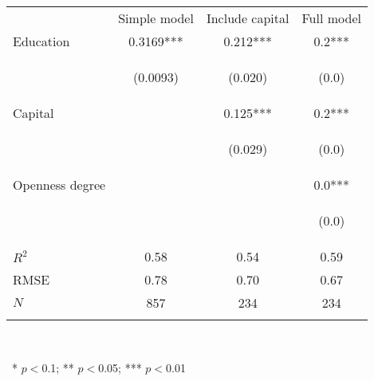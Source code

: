 \begin{center}
\begin{tabular}{lccc}
\hline \noalign{\smallskip} & Simple model & Include capital & Full model\\
\noalign{\smallskip}\hline \noalign{\smallskip}Education & 0.3169*** & 0.212*** & 0.2***\\
 & \begin{footnotesize}(0.0093)\end{footnotesize} & \begin{footnotesize}(0.020)\end{footnotesize} & \begin{footnotesize}(0.0)\end{footnotesize}\\
\noalign{\smallskip}Capital &  & 0.125*** & 0.2***\\
 & \begin{footnotesize}\end{footnotesize} & \begin{footnotesize}(0.029)\end{footnotesize} & \begin{footnotesize}(0.0)\end{footnotesize}\\
\noalign{\smallskip}Openness degree &  &  & 0.0***\\
 & \begin{footnotesize}\end{footnotesize} & \begin{footnotesize}\end{footnotesize} & \begin{footnotesize}(0.0)\end{footnotesize}\\
\noalign{\smallskip}$R^2$ & 0.58 & 0.54 & 0.59\\
RMSE & 0.78 & 0.70 & 0.67\\
$N$ & 857 & 234 & 234\\
\noalign{\smallskip}\hline\end{tabular}\\
\smallskip\begin{footnotesize}\ * $p<0$.1; ** $p<0$.05; *** $p<0$.01\end{footnotesize}\\
\smallskip
\end{center}
